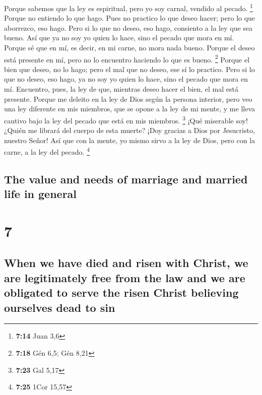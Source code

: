 \begin{paracol}{2}
 Porque sabemos que la ley es espiritual, pero yo soy
carnal, vendido al pecado. \footnote{\textbf{7:14} Juan 3,6}
 Porque no entiendo lo que hago. Pues no practico lo que
deseo hacer; pero lo que aborrezco, eso hago.  Pero si lo
que no deseo, eso hago, consiento a la ley que sea bueno.
 Así que ya no soy yo quien lo hace, sino el pecado que
mora en mí.  Porque sé que en mí, es decir, en mi carne,
no mora nada bueno. Porque el deseo está presente en mí, pero no lo
encuentro haciendo lo que es bueno. \footnote{\textbf{7:18} Gén 6,5; Gén
  8,21}  Porque el bien que deseo, no lo hago; pero el
mal que no deseo, ese sí lo practico.  Pero si lo que no
deseo, eso hago, ya no soy yo quien lo hace, sino el pecado que mora en
mí.  Encuentro, pues, la ley de que, mientras deseo hacer
el bien, el mal está presente.  Porque me deleito en la
ley de Dios según la persona interior,  pero veo una ley
diferente en mis miembros, que se opone a la ley de mi mente, y me lleva
cautivo bajo la ley del pecado que está en mis miembros. \footnote{\textbf{7:23}
  Gal 5,17}  ¡Qué miserable soy! ¿Quién me librará del
cuerpo de esta muerte?  ¡Doy gracias a Dios por
Jesucristo, nuestro Señor! Así que con la mente, yo mismo sirvo a la ley
de Dios, pero con la carne, a la ley del pecado. \footnote{\textbf{7:25}
  1Cor 15,57}

\switchcolumn
\begin{otherlanguage}{english}

\hypertarget{the-value-and-needs-of-marriage-and-married-life-in-general}{%
\subsection{The value and needs of marriage and married life in
general}\label{the-value-and-needs-of-marriage-and-married-life-in-general}}

\hypertarget{section-13}{%
\section{7}\label{section-13}}

\hypertarget{when-we-have-died-and-risen-with-christ-we-are-legitimately-free-from-the-law-and-we-are-obligated-to-serve-the-risen-christ-believing-ourselves-dead-to-sin}{%
\subsection{When we have died and risen with Christ, we are legitimately
free from the law and we are obligated to serve the risen Christ
believing ourselves dead to
sin}\label{when-we-have-died-and-risen-with-christ-we-are-legitimately-free-from-the-law-and-we-are-obligated-to-serve-the-risen-christ-believing-ourselves-dead-to-sin}}


\end{otherlanguage}
\end{paracol}
